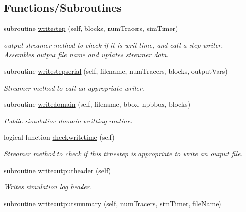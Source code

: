 \subsection*{Functions/\+Subroutines}
\begin{DoxyCompactItemize}
\item 
subroutine \mbox{\hyperlink{namespacesimulationoutputstreamer__mod_a689f65c821b78d46b142653214338b85}{writestep}} (self, blocks, num\+Tracers, sim\+Timer)
\begin{DoxyCompactList}\small\item\em output streamer method to check if it is writ time, and call a step writer. Assembles output file name and updates streamer data. \end{DoxyCompactList}\item 
subroutine \mbox{\hyperlink{namespacesimulationoutputstreamer__mod_a0382795016b75f3724cd7483857a4ec8}{writestepserial}} (self, filename, num\+Tracers, blocks, output\+Vars)
\begin{DoxyCompactList}\small\item\em Streamer method to call an appropriate writer. \end{DoxyCompactList}\item 
subroutine \mbox{\hyperlink{namespacesimulationoutputstreamer__mod_a2c660b4331c576befebcf037b82b8d7a}{writedomain}} (self, filename, bbox, npbbox, blocks)
\begin{DoxyCompactList}\small\item\em Public simulation domain writting routine. \end{DoxyCompactList}\item 
logical function \mbox{\hyperlink{namespacesimulationoutputstreamer__mod_a81b788c12b0520901e6fc9b113a10dec}{checkwritetime}} (self)
\begin{DoxyCompactList}\small\item\em Streamer method to check if this timestep is appropriate to write an output file. \end{DoxyCompactList}\item 
subroutine \mbox{\hyperlink{namespacesimulationoutputstreamer__mod_a6f01bdc663fe5f4a842150a6aac90f67}{writeoutputheader}} (self)
\begin{DoxyCompactList}\small\item\em Writes simulation log header. \end{DoxyCompactList}\item 
subroutine \mbox{\hyperlink{namespacesimulationoutputstreamer__mod_a8b34c75e869c6409de7d6e5ceca5cca7}{writeoutputsummary}} (self, num\+Tracers, sim\+Timer, file\+Name)

\end{DoxyCompactItemize}
